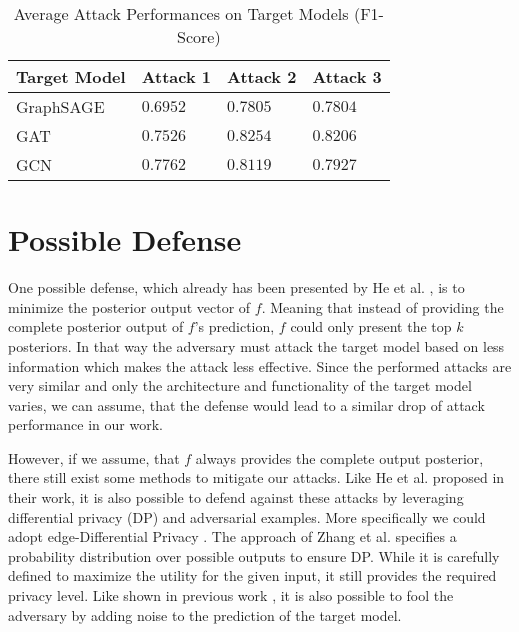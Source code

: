         \vspace{0.48cm}
        \begin{table}[!h]
            \centering
            \footnotesize
            \begin{tabular}{l|l|l|l|}
            \toprule
            Target Model & Attack 1 & Attack 2 & Attack 3 \\
            \midrule
            GraphSAGE & $0.6952$ & $0.7805$ & $0.7804$ \\
            GAT & $0.7526$ & $0.8254$ & $0.8206$ \\
            GCN & $0.7762$ & $0.8119$ & $0.7927$ \\
              
            \bottomrule
            \end{tabular}
            \caption{Average Attack Performances on Target Models (F1-Score)}
            \label{table:attack-avg-results-all}
        \end{table}
            
    
    \section{Possible Defense}
        One possible defense, which already has been presented by He et al. \cite{DBLP:journals/corr/abs-2005-02131}, is to minimize the posterior output vector of $f$. 
        Meaning that instead of providing the complete posterior output of $f$'s prediction, $f$ could only present the top $k$ posteriors.
        In that way the adversary must attack the target model based on less information which makes the attack less effective.
        Since the performed attacks are very similar and only the architecture and functionality of the target model varies, we can assume, that the defense would lead to a similar drop of attack performance in our work.
        
        However, if we assume, that $f$ always provides the complete output posterior, there still exist some methods to mitigate our attacks. 
        Like He et al. proposed in their work, it is also possible to defend against these attacks by leveraging differential privacy (DP) and adversarial examples.
        More specifically we could adopt edge-Differential Privacy \cite{Hay_accurateestimation, lu2020protect, 8345716, Zhang_2015}.
        The approach of Zhang et al. \cite{Zhang_2015} specifies a probability distribution over possible outputs to ensure DP.
        While it is carefully defined to maximize the utility for the given input, it still provides the required privacy level.
        Like shown in previous work \cite{jia2020attriguard, jia2019memguard}, it is also possible to fool the adversary by adding noise to the prediction of the target model.

